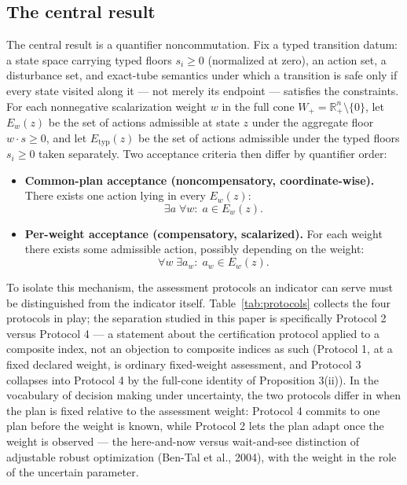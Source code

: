 \documentclass[3p,11pt]{elsarticle}
\providecommand{\tightlist}{\setlength{\itemsep}{0pt}\setlength{\parskip}{0pt}}
\begin{document}
\subsection{The central result}\label{the-central-result}

The central result is a quantifier noncommutation. Fix a
typed transition datum: a state space carrying typed floors
\(s_i \ge 0\) (normalized at zero), an action set, a disturbance set,
and exact-tube semantics under which a transition is safe only if every
state visited along it --- not merely its endpoint --- satisfies the
constraints. For each nonnegative scalarization weight \(w\) in the full
cone \(W_+ = \mathbb{R}^n_+ \setminus \{0\}\), let \(E_w(z)\) be the set
of actions admissible at state \(z\) under the aggregate floor
\(w \cdot s \ge 0\), and let \(E_{\mathrm{typ}}(z)\) be the set of
actions admissible under the typed floors \(s_i \ge 0\) taken
separately. Two acceptance criteria then differ by quantifier order:

\begin{itemize}
\tightlist
\item
  \textbf{Common-plan acceptance (noncompensatory, coordinate-wise).} There exists one
  action lying in every \(E_w(z)\):
  \[\exists a\; \forall w:\; a \in E_w(z).\]
\item
  \textbf{Per-weight acceptance (compensatory, scalarized).} For each weight there
  exists some admissible action, possibly depending on the weight:
  \[\forall w\; \exists a_w:\; a_w \in E_w(z).\]
\end{itemize}
To isolate this mechanism, the assessment protocols an indicator can serve
must be distinguished from the indicator itself.
Table~\ref{tab:protocols} collects the four protocols in play; the
separation studied in this paper is specifically Protocol 2 versus
Protocol 4 --- a statement about the certification protocol applied to a
composite index, not an objection to composite indices as such (Protocol
1, at a fixed declared weight, is ordinary fixed-weight assessment, and
Protocol 3 collapses into Protocol 4 by the full-cone identity of
Proposition 3(ii)). In the vocabulary of decision making under
uncertainty, the two protocols differ in when the plan is fixed relative
to the assessment weight: Protocol 4 commits to one plan before the
weight is known, while Protocol 2 lets the plan adapt once the weight is
observed --- the here-and-now versus wait-and-see distinction of
adjustable robust optimization (Ben-Tal et al., 2004), with the weight
in the role of the uncertain parameter.
\end{document}
